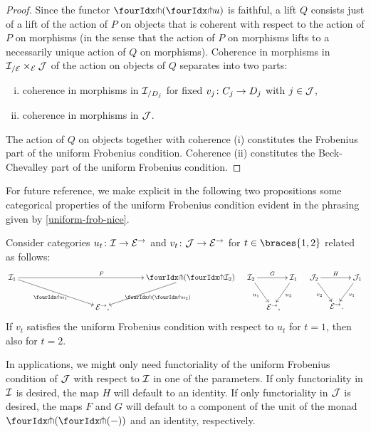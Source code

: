 \documentclass[reqno,10pt,a4paper,oneside,draft]{amsart}
\begin{document}
\begin{proof}
Since the functor $\liftl{(\liftr{u})}$ is faithful, a lift $Q$ consists just of a lift of the action of $P$ on objects that is coherent with respect to the action of $P$ on morphisms (in the sense that the action of $P$ on morphisms lifts to a necessarily unique action of $Q$ on morphisms).
Coherence in morphisms in $\cal{I}_{/\cal{E}} \times_{\cal{E}} \cal{J}$ of the action on objects of $Q$ separates into two parts:
\begin{enumerate}[(i)]
\item coherence in morphisms in $\cal{I}_{/D_j}$ for fixed $v_j \co C_j \to D_j$ with $j \in \cal{J}$,
\item coherence in morphisms in $\cal{J}$.
\end{enumerate}
The action of $Q$ on objects together with coherence (i) constitutes the Frobenius part of the uniform Frobenius condition.
Coherence (ii) constitutes the Beck-Chevalley part of the uniform Frobenius condition.
\end{proof}

For future reference, we make explicit in the following two propositions some categorical properties of the uniform Frobenius condition evident in the phrasing given by \cref{uniform-frob-nice}.

\begin{proposition} \label{uniform-frobenius-functorial}
Consider categories $u_t \co \cal{I} \to \cal{E}^\to$ and $v_t \co \cal{J} \to \cal{E}^\to$ for $t \in \braces{1, 2}$ related as follows:
\begin{align*}
\xymatrix@!C@C-3em{
  \cal{I}_1
  \ar[rr]^{F}
  \ar[dr]_{\liftr{u_1}}
&&
  \liftl{(\liftr{\cal{I}_2})}
  \ar[dl]^{\liftl{(\liftr{u_2})}}
\\&
  \catE^\to
\rlap{,}}
&&
\xymatrix@C-1.5em{
  \cal{I}_2
  \ar[rr]^-{G}
  \ar[dr]_{u_1}
&&
  \cal{I}_1
  \ar[dl]^{u_2}
\\&
  \catE^\to
\rlap{,}}
&&
\xymatrix@C-1.5em{
  \cal{J}_2
  \ar[rr]^-{H}
  \ar[dr]_{v_2}
&&
  \cal{J}_1
  \ar[dl]^{v_1}
\\&
  \catE^\to
\rlap{.}}
\end{align*}
If $v_t$ satisfies the uniform Frobenius condition with respect to $u_t$ for $t = 1$, then also for $t = 2$.
\end{proposition}

In applications, we might only need functoriality of the uniform Frobenius condition of $\cal{J}$ with respect to $\cal{I}$ in one of the parameters.
If only functoriality in $\cal{I}$ is desired, the map $H$ will default to an identity.
If only functoriality in $\cal{J}$ is desired, the maps $F$ and $G$ will default to a component of the unit of the monad $\liftl{(\liftr{(-)})}$ and an identity, respectively.
\end{document}
